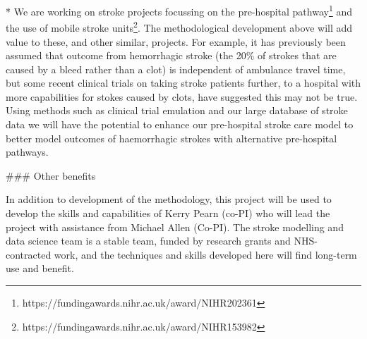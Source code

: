 \begin{markdown}
* We are working on stroke projects focussing on the pre-hospital pathway\footnote{https://fundingawards.nihr.ac.uk/award/NIHR202361} and the use of mobile stroke units\footnote{https://fundingawards.nihr.ac.uk/award/NIHR153982}. The methodological development above will add value to these, and other similar, projects. For example, it has previously been assumed that outcome from hemorrhagic stroke (the 20\% of strokes that are caused by a bleed rather than a clot) is independent of ambulance travel time, but some recent clinical trials on taking stroke patients further, to a hospital with more capabilities for stokes caused by clots, have suggested this may not be true. Using methods such as clinical trial emulation and our large database of stroke data we will have the potential to enhance our pre-hospital stroke care model to better model outcomes of haemorrhagic strokes with alternative pre-hospital pathways.

### Other benefits

In addition to development of the methodology, this project will be used to develop the skills and capabilities of Kerry Pearn (co-PI) who will lead the project with assistance from Michael Allen (Co-PI). The stroke modelling and data science team is a stable team, funded by research grants and NHS-contracted work, and the techniques and skills developed here will find long-term use and benefit.

\end{markdown}
